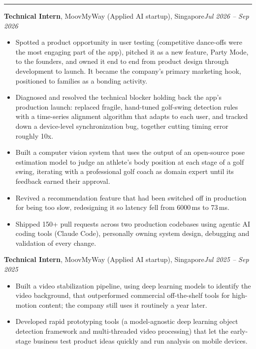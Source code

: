 \documentclass[11pt]{article}
\newcommand{\cvsection}[1]{%
  \vspace{10pt}%
  \noindent{\large\bfseries\MakeUppercase{#1}}\par
  \vspace{-4pt}\noindent\rule{\linewidth}{0.7pt}\vspace{4pt}%
}
\begin{document}
\cvsection{Experience}
\noindent\textbf{Technical Intern}, MoovMyWay (Applied AI startup), Singapore\hfill\textit{Jul 2026 -- Sep 2026}\par
\begin{itemize}
  \item Spotted a product opportunity in user testing (competitive dance-offs were the most engaging part of the app), pitched it as a new feature, Party Mode, to the founders, and owned it end to end from product design through development to launch. It became the company's primary marketing hook, positioned to families as a bonding activity.
  \item Diagnosed and resolved the technical blocker holding back the app's production launch: replaced fragile, hand-tuned golf-swing detection rules with a time-series alignment algorithm that adapts to each user, and tracked down a device-level synchronization bug, together cutting timing error roughly 10x.
  \item Built a computer vision system that uses the output of an open-source pose estimation model to judge an athlete's body position at each stage of a golf swing, iterating with a professional golf coach as domain expert until its feedback earned their approval.
  \item Revived a recommendation feature that had been switched off in production for being too slow, redesigning it so latency fell from 6000\,ms to 73\,ms.
  \item Shipped 150+ pull requests across two production codebases using agentic AI coding tools (Claude Code), personally owning system design, debugging and validation of every change.
\end{itemize}

\vspace{4pt}
\noindent\textbf{Technical Intern}, MoovMyWay (Applied AI startup), Singapore\hfill\textit{Jul 2025 -- Sep 2025}\par
\begin{itemize}
  \item Built a video stabilization pipeline, using deep learning models to identify the video background, that outperformed commercial off-the-shelf tools for high-motion content; the company still uses it routinely a year later.
  \item Developed rapid prototyping tools (a model-agnostic deep learning object detection framework and multi-threaded video processing) that let the early-stage business test product ideas quickly and run analysis on mobile devices.
\end{itemize}
\end{document}
